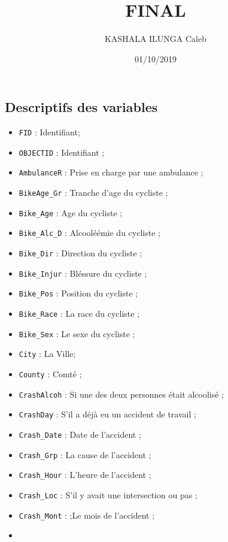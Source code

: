 \documentclass[
  french,
]{article}
\title{FINAL}
\author{KASHALA ILUNGA Caleb}
\date{01/10/2019}
\providecommand{\tightlist}{%
  \setlength{\itemsep}{0pt}\setlength{\parskip}{0pt}}
\begin{document}
\maketitle

{
\setcounter{tocdepth}{2}
\tableofcontents
}
\newpage

\hypertarget{descriptifs-des-variables}{%
\subsection{Descriptifs des variables}\label{descriptifs-des-variables}}

\begin{itemize}
\tightlist
\item
  \texttt{FID} : Identifiant;
\item
  \texttt{OBJECTID} : Identifiant ;
\item
  \texttt{AmbulanceR} : Prise en charge par une ambulance ;
\item
  \texttt{BikeAge\_Gr} : Tranche d'age du cycliste ;
\item
  \texttt{Bike\_Age} : Age du cycliste ;
\item
  \texttt{Bike\_Alc\_D} : Alcooléémie du cycliste ;
\item
  \texttt{Bike\_Dir} : Direction du cycliste ;
\item
  \texttt{Bike\_Injur} : Bléssure du cycliste ;
\item
  \texttt{Bike\_Pos} : Position du cycliste ;
\item
  \texttt{Bike\_Race} : La race du cycliste ;
\item
  \texttt{Bike\_Sex} : Le sexe du cycliste ;
\item
  \texttt{City} : La Ville;
\item
  \texttt{County} : Comté ;
\item
  \texttt{CrashAlcoh} : Si une des deux personnes était alcoolisé ;
\item
  \texttt{CrashDay} : S'il a déjà eu un accident de travail ;
\item
  \texttt{Crash\_Date} : Date de l'accident ;
\item
  \texttt{Crash\_Grp} : La cause de l'accident ;
\item
  \texttt{Crash\_Hour} : L'heure de l'accident ;
\item
  \texttt{Crash\_Loc} : S'il y avait une intersection ou pas ;
\item
  \texttt{Crash\_Mont} : ;Le mois de l'accident ;
\item

\end{itemize}
\end{document}
